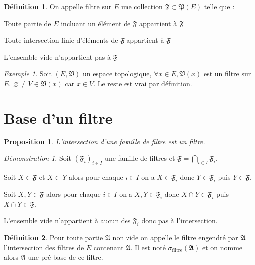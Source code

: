 \documentclass[a4paper, 11pt, french]{book}
\newenvironment{itemise}{\itemize}{\enditemize}
\theoremstyle{plain} %
\newtheorem{proposition}{Proposition}
\theoremstyle{definition} %
\newtheorem{definition}{Définition}
\theoremstyle{remark} %
\newtheorem{exemple}{Exemple}
\newtheorem*{demonstration}{Démonstration}
\newcommand{\1}{\mathds{1}}
\newcommand\vide{\varnothing}
\renewcommand{\frak}[1]{\mathfrak{#1}}
\newcommand{\rm}[1]{\mathrm{#1}}
\begin{document}
\begin{definition}
	On appelle filtre sur $E$ une collection $\frak{F}\subset\frak{P}(E)$ telle que :
	\begin{itemise}
		\item Toute partie de $E$ incluant un élément de $\frak{F}$ appartient à $\frak{F}$
		\item Toute intersection finie d'éléments de $\frak{F}$ appartient à $\frak{F}$
		\item L'ensemble vide n'appartient pas à $\frak{F}$
	\end{itemise}
\end{definition}

\begin{exemple}
	Soit $(E, \frak{V})$ un espace topologique, $\forall x\in E, \frak{V}(x)$ est un filtre sur $E$.
	$\vide\neq V\in\frak{V}(x)$ car $x\in V$.
	Le reste est vrai par définition.
\end{exemple}

\section{Base d'un filtre}

\begin{proposition}
	L'intersection d'une famille de filtre est un filtre.
\end{proposition}

\begin{demonstration}
	Soit $(\frak{F}_i)_{i\in I}$ une famille de filtres et $\frak{F}=\bigcap_{i\in I}\frak{F}_i$.
	\begin{itemise}
		\item Soit $X\in\frak{F}$ et $X\subset Y$ alors pour chaque $i\in I$ on a $X\in\frak{F}_i$ donc $Y\in\frak{F}_i$ puis $Y\in\frak{F}$.
		\item Soit $X, Y\in\frak{F}$ alors pour chaque $i\in I$ on a $X, Y\in\frak{F}_i$ donc $X\cap Y\in\frak{F}_i$ puis $X\cap Y\in\frak{F}$.
		\item L'ensemble vide n'appartient à aucun des $\frak{F}_i$ donc pas à l'intersection.
	\end{itemise}
\end{demonstration}

\begin{definition}
	Pour toute partie $\frak{A}$ non vide on appelle le filtre engendré par $\frak{A}$ l'intersection des filtres de $E$ contenant $\frak{A}$.
	Il est noté $\sigma_\rm{filtre}(\frak{A})$ et on nomme alors $\frak{A}$ une pré-base de ce filtre.
\end{definition}
\end{document}
